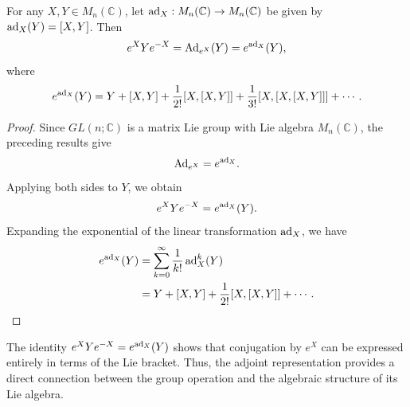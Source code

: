 \documentclass[../main.tex]{subfiles}
\begin{document}
\begin{proposition}{}{}
  For any $X,Y\in M_n(\mathbb{C})$, let $\operatorname{ad}_X:M_n(\mathbb{C})\to M_n(\mathbb{C})$ be given by $\operatorname{ad}_X(Y)=[X,Y]$. Then
  \begin{equation}
    e^XYe^{-X}=\operatorname{Ad}_{e^X}(Y)=e^{\operatorname{ad}_X}(Y),
  \end{equation}
  where
  \begin{equation}
    e^{\operatorname{ad}_X}(Y)
    =Y+[X,Y]+\frac{1}{2!}[X,[X,Y]]
    +\frac{1}{3!}[X,[X,[X,Y]]]+\cdots.
  \end{equation}
\end{proposition}
\begin{proof}
  Since $GL(n;\mathbb{C})$ is a matrix Lie group with Lie algebra $M_n(\mathbb{C})$, the preceding results give
  \begin{equation*}
    \operatorname{Ad}_{e^X}=e^{\operatorname{ad}_X}.
  \end{equation*}
  Applying both sides to $Y$, we obtain
  \begin{equation*}
    e^XYe^{-X}=e^{\operatorname{ad}_X}(Y).
  \end{equation*}
  Expanding the exponential of the linear transformation $\operatorname{ad}_X$, we have
  \begin{equation*}
    \begin{aligned}
      e^{\operatorname{ad}_X}(Y)
      &=\sum_{k=0}^{\infty}\frac{1}{k!}\operatorname{ad}_X^k(Y)\\
      &=Y+[X,Y]+\frac{1}{2!}[X,[X,Y]]+\cdots.
    \end{aligned}
  \end{equation*}
\end{proof}

\begin{remark}
  The identity $e^XYe^{-X}=e^{\operatorname{ad}_X}(Y)$ shows that conjugation by $e^X$ can be expressed entirely in terms of the Lie bracket. Thus, the adjoint representation provides a direct connection between the group operation and the algebraic structure of its Lie algebra.
\end{remark}
\end{document}
